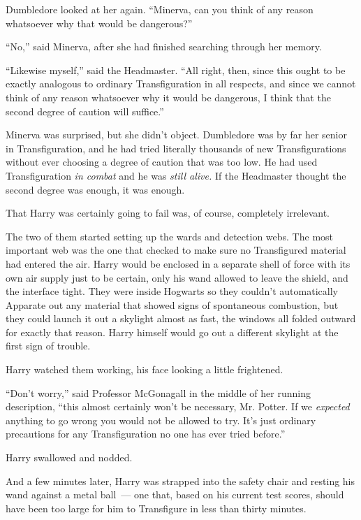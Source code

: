 Dumbledore looked at her again. ``Minerva, can you think of any reason whatsoever why that would be dangerous?''

``No,'' said Minerva, after she had finished searching through her memory.

``Likewise myself,'' said the Headmaster. ``All right, then, since this ought to be exactly analogous to ordinary Transfiguration in all respects, and since we cannot think of any reason whatsoever why it would be dangerous, I think that the second degree of caution will suffice.''

Minerva was surprised, but she didn't object. Dumbledore was by far her senior in Transfiguration, and he had tried literally thousands of new Transfigurations without ever choosing a degree of caution that was too low. He had used Transfiguration \emph{in combat} and he was \emph{still alive.} If the Headmaster thought the second degree was enough, it was enough.

That Harry was certainly going to fail was, of course, completely irrelevant.

The two of them started setting up the wards and detection webs. The most important web was the one that checked to make sure no Transfigured material had entered the air. Harry would be enclosed in a separate shell of force with its own air supply just to be certain, only his wand allowed to leave the shield, and the interface tight. They were inside Hogwarts so they couldn't automatically Apparate out any material that showed signs of spontaneous combustion, but they could launch it out a skylight almost as fast, the windows all folded outward for exactly that reason. Harry himself would go out a different skylight at the first sign of trouble.

Harry watched them working, his face looking a little frightened.

``Don't worry,'' said Professor McGonagall in the middle of her running description, ``this almost certainly won't be necessary, Mr. Potter. If we \emph{expected} anything to go wrong you would not be allowed to try. It's just ordinary precautions for any Transfiguration no one has ever tried before.''

Harry swallowed and nodded.

And a few minutes later, Harry was strapped into the safety chair and resting his wand against a metal ball~--- one that, based on his current test scores, should have been too large for him to Transfigure in less than thirty minutes.

